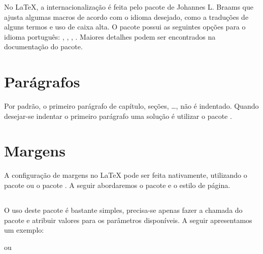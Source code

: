 No LaTeX, a internacionalização é feita pelo pacote
 de Johannes L. Braams que
ajusta algumas macros de acordo com o idioma desejado, como a traduções de
alguns termos e uso de caixa alta. O pacote  possui as
seguintes opções para o idioma português: , ,
, . Maiores detalhes podem ser encontrados na
documentação do pacote\cite{Braams:2008:Babel}.

\section{Parágrafos}
Por padrão, o primeiro parágrafo de capítulo, seções, \dots, não é indentado.
Quando desejar-se indentar o primeiro parágrafo uma solução é utilizar o pacote
.

\section{Margens}
A configuração de margens no LaTeX pode ser feita nativamente,
utilizando o pacote  ou o pacote . A seguir
abordaremos o pacote  e o estilo de página.

\subsection{}
O uso deste pacote é bastante simples, precisa-se apenas fazer a chamada do
pacote e atribuir valores para os parâmetros disponíveis. A seguir apresentamos
um exemplo:
\begin{code}
  \usepackage{geometry}
  \geometry{parametro = comprimento, ...}
\end{code}
ou
\begin{code}
  \usepackage[parametro = comprimento, ...]{geometry}
\end{code}

